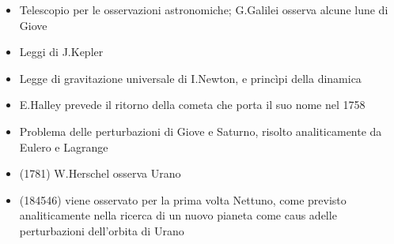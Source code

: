 \documentclass[letterpaper,10pt,italian]{jupyterBook}
\begin{document}
\sphinxAtStartPar
{}
\begin{itemize}
\item {} 
\sphinxAtStartPar
Telescopio per le osservazioni astronomiche; G.Galilei osserva alcune lune di Giove

\item {} 
\sphinxAtStartPar
Leggi di J.Kepler

\item {} 
\sphinxAtStartPar
Legge di gravitazione universale di I.Newton, e princìpi della dinamica

\item {} 
\sphinxAtStartPar
E.Halley prevede il ritorno della cometa che porta il suo nome nel 1758

\item {} 
\sphinxAtStartPar
Problema delle perturbazioni di Giove e Saturno, risolto analiticamente da Eulero e Lagrange

\item {} 
\sphinxAtStartPar
(1781) W.Herschel osserva Urano

\item {} 
\sphinxAtStartPar
(1845\sphinxhyphen{}46) viene osservato per la prima volta Nettuno, come previsto analiticamente nella ricerca di un nuovo pianeta come caus adelle perturbazioni dell’orbita di Urano

\end{itemize}
\end{document}
